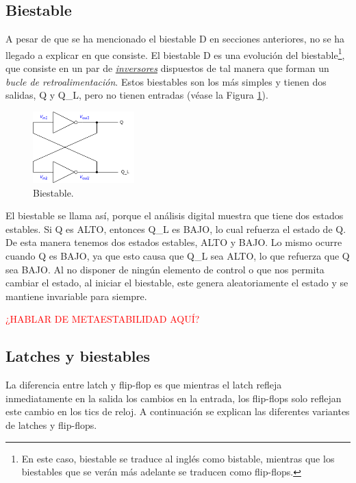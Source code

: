 \subsection{Biestable}
A pesar de que se ha mencionado el biestable D en secciones anteriores, no se ha llegado a explicar en que consiste. El biestable D es una evolución del biestable\footnote{En este caso, biestable se traduce al inglés como bistable, mientras que los biestables que se verán más adelante se traducen como flip-flops.}, que consiste en un par de \hyperlink{inverter}{\emph{inversores}} dispuestos de tal manera que forman un \emph{bucle de retroalimentación}. Estos biestables son los más simples y tienen dos salidas, Q y Q\_L, pero no tienen entradas (véase la Figura \ref{fig:biestable}).

\begin{figure}
	\centering
	\includegraphics[width=0.35\textwidth]{figs/biestable.drawio.png}
	\caption{Biestable.}
	\label{fig:biestable}
\end{figure}

El biestable se llama así, porque el análisis digital muestra que tiene dos estados estables. Si Q es ALTO, entonces Q\_L es BAJO, lo cual refuerza el estado de Q. De esta manera tenemos dos estados estables, ALTO y BAJO. Lo mismo ocurre cuando Q es BAJO, ya que esto causa que Q\_L sea ALTO, lo que refuerza que Q sea BAJO. Al no disponer de ningún elemento de control o que nos permita cambiar el estado, al iniciar el biestable, este genera aleatoriamente el estado y se mantiene invariable para siempre.

\textcolor{red}{¿HABLAR DE METAESTABILIDAD AQUÍ?}

\subsection{Latches y biestables}
La diferencia entre latch y flip-flop es que mientras el latch refleja inmediatamente en la salida los cambios en la entrada, los flip-flops solo reflejan este cambio en los tics de reloj. A continuación se explican las diferentes variantes de latches y flip-flops.

